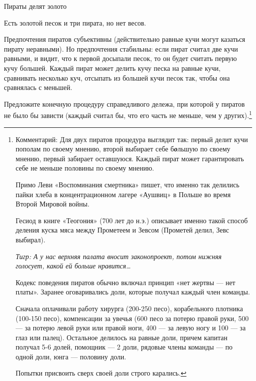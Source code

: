 \begin{problem}
 Пираты делят золото\cite{brams:efcdp} \par
Есть золотой песок и три пирата, но нет весов.\par
Предпочтения пиратов субъективны (действительно равные кучи могут казаться пирату неравными). Но предпочтения стабильны: если пират считал две кучи равными,  и видит, что к первой досыпали песок, то он будет считать первую кучу большей. Каждый пират может делить кучу песка на равные кучи, сравнивать несколько куч, отсыпать из большей кучи песок так, чтобы она сравнялась с меньшей.\par

Предложите конечную процедуру справедливого дележа, при которой у пиратов не было бы зависти (каждый считал бы, что его часть не меньше, чем у других).\footnote{ Комментарий: Для двух пиратов процедура выглядит так: первый делит кучи пополам по своему мнению, второй выбирает себе б{\bf {\it о}}льшую по своему мнению, первый забирает оставшуюся. Каждый пират может гарантировать себе не меньше половины по своему мнению. \par
Примо Леви «Воспоминания смертника» пишет, что именно так делились пайки хлеба в концентрационном лагере «Аушвиц» в Польше во время Второй Мировой войны. \par
Гесиод в книге «Теогония» (700 лет до н.э.) описывает именно такой способ деления куска мяса между Прометеем и Зевсом (Прометей делил, Зевс выбирал). \par
{\it Тигр: А у нас верхняя палата вносит законопроект, потом нижняя голосует, какой ей больше нравится\ldots }

Кодекс поведения пиратов обычно включал принцип «нет жертвы — нет платы». Заранее оговаривались доли, которые получал каждый член команды.\par
Сначала оплачивали работу хирурга (200-250 песо), корабельного плотника (100-150 песо), компенсации за увечья (600 песо за потерю правой руки, 500 — за потерю левой руки или правой ноги, 400 — за левую ногу и 100 — за глаз или палец). Остальное делилось на равные доли, причем капитан получал 5-6 долей, помощник — 2 доли, рядовые члены команды  — по одной доли, юнга — половину доли.\par
Попытки присвоить сверх своей доли строго карались\cite{brams:dps}. }



\begin{sol}

\end{sol}
\end{problem}



